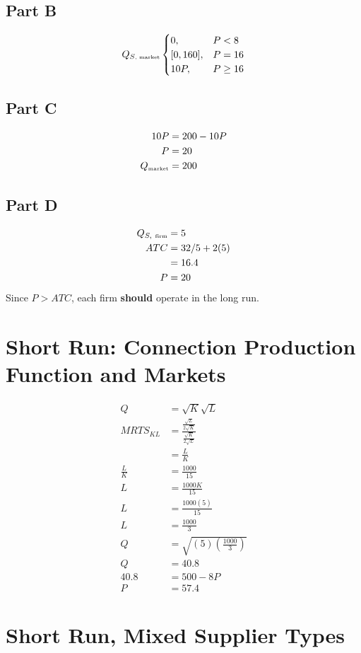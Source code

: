 \documentclass[8pt]{extarticle}
\begin{document}
{\subsection*{Part B}
\[
Q_{S\textrm{\tiny, market}}\begin{cases}
	0, & P<8\\
	[0,160], & P = 16 \\
	10P, & P\geq 16
\end{cases}
\]
\subsection*{Part C}
\begin{align*}
	10P &= 200-10P \\
	P &= 20 \\
	Q_{\textrm{\tiny market}} &= 200 \\
\end{align*}
	
\subsection*{Part D}
\begin{align*}
	Q_{S,~\textrm{\tiny firm}} &= 5 \\
	ATC &= 32/5 + 2(5) \\
	&= 16.4 \\
	P &= 20
\end{align*}
Since $P > ATC$, each firm \textbf{should} operate in the long run.
\section*{Short Run: Connection Production Function and Markets}
\begin{align*}
	Q &= \sqrt{K}\sqrt{L} \\
	MRTS_{KL} &= \frac{\frac{\sqrt{L}}{2\sqrt{K}}}{\frac{\sqrt{K}}{2\sqrt{L}}} \\
	&= \frac{L}{K} \\
	\frac{L}{K} &= \frac{1000}{15} \\
	L &= \frac{1000K}{15}\\
	L &= \frac{1000(5)}{15} \\
	L &= \frac{1000}{3}\\
	Q &= \sqrt{(5)\left(\frac{1000}{3}\right)} \\
	Q &= 40.8 \\
	40.8 &= 500-8P \\
	P &= 57.4
\end{align*}
\section*{Short Run, Mixed Supplier Types}
}
\end{document}
